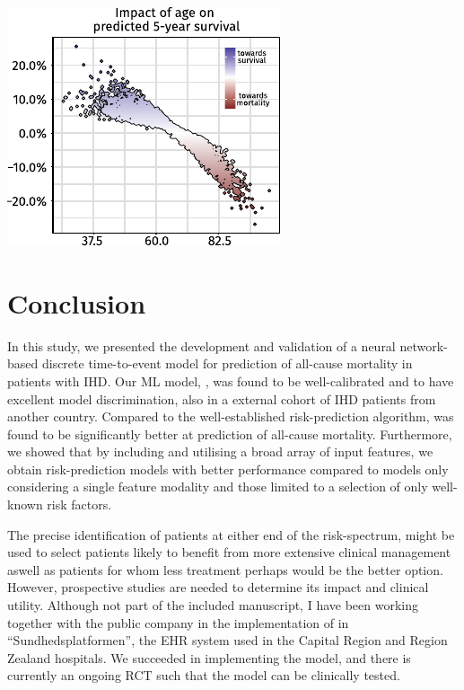 \begin{marginfigure}
    \includegraphics{graphics/pmhnet-v1-shap-age.pdf}
    \caption[\acs{SHAP} Dependence Plot for Age]{%
        Example of a \acs{SHAP} dependence plot 
        showing the \ac{SHAP} value of each \enquote{age} feature
        across the entire test set.}
    \label{fig:shap-dependence-age}
\end{marginfigure}%

\section{Conclusion}

In this study, we presented the development and validation of a 
neural network-based discrete time-to-event model for prediction of 
all-cause mortality in patients with \ac{IHD}. 
Our \ac{ML} model, , was found to be well-calibrated and 
to have excellent model discrimination, also in a external cohort 
of \ac{IHD} patients from another country.
Compared to the well-established \graceii{} risk-prediction algorithm,
 was found to be significantly better at prediction of all-cause 
mortality.
Furthermore, we showed that by including and utilising a broad array 
of input features, we obtain risk-prediction models with better performance
compared to models only considering a single feature modality and
those limited to a selection of only well-known risk factors.

The precise identification of patients at either end of the risk-spectrum,
might be used to select 
patients likely to benefit from more extensive clinical management 
aswell as patients for whom less treatment perhaps 
would be the better option.
However, prospective studies are needed to determine its  impact and
clinical utility.  
Although not part of the included manuscript, 
I have been working together with the public company 
in the implementation of  in \enquote{Sundhedsplatformen}, 
the \ac{EHR} system used in the Capital Region and Region Zealand hospitals.
We succeeded in implementing the model, and there is currently 
an ongoing \ac{RCT} such that the model can be clinically tested.
~\autocite{bundgaardClinical2023}
